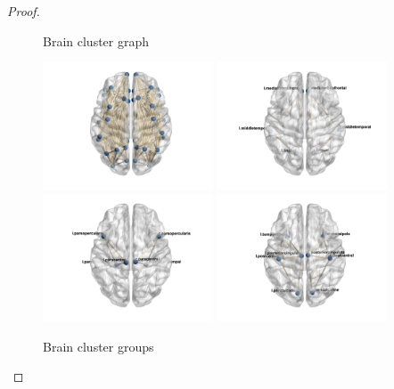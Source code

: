\documentclass[11pt]{article}
\theoremstyle{plain}
\theoremstyle{definition}
\begin{document}
\begin{proof}
\begin{figure}[H]
  \label{figure:cluster graph}
  \caption{Brain cluster graph}
\end{figure}


\begin{figure}[H]
  \centering
 \includegraphics[width = 0.45\textwidth]{brain1.jpg}
 \includegraphics[width = 0.45\textwidth]{brain2.jpg}
 \includegraphics[width = 0.45\textwidth]{brain3.jpg}
 \includegraphics[width = 0.45\textwidth]{brain4.jpg}
  \label{figure:clustering}
  \caption{Brain cluster groups}
\end{figure}


\end{proof}



\end{document}

